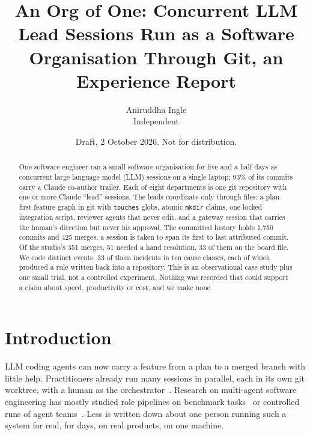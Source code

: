 \documentclass[11pt]{article}
\title{An Org of One: Concurrent LLM Lead Sessions Run as a Software Organisation
  Through Git, an Experience Report}
\author{Aniruddha Ingle\\Independent}
\date{Draft, 2 October 2026. Not for distribution.}
\newcommand{\code}[1]{\texttt{#1}}
\begin{document}
\maketitle

\begin{abstract}
One software engineer ran a small software organisation for five and a half days as %
concurrent large language model (LLM) sessions on a single laptop; 93\% of its commits %
carry a Claude co-author trailer. Each of eight departments is one git repository with one or more Claude %
``lead'' sessions. The leads coordinate only through files: a plan-first feature graph in
git with \code{touches} globs, atomic \code{mkdir} claims, one locked integration script,
reviewer agents that never edit, and a gateway session that carries the human's direction
but never his approval. The committed history holds 1,750 commits and 425 merges. %
a session is taken to span its first to last attributed commit. Of the studio's 351 %
merges, 51 needed a hand resolution, 33 of them on the board file. We code %
distinct events, 33 of them incidents in ten cause classes, each of which produced a rule %
written back into a repository. This is an observational case study plus one small
trial, not a controlled experiment. Nothing was recorded that could support a claim
about speed, productivity or cost, and we make none.
\end{abstract}

\section{Introduction}\label{sec:intro}

LLM coding agents can now carry a feature from a plan to a merged branch with little help.
Practitioners already run many sessions in parallel, each in its own git worktree, with a
human as the orchestrator~\citep{mason2026agents}. Research on multi-agent software
engineering has mostly studied role pipelines on benchmark
tasks~\citep{hong2023metagpt,qian2024chatdev,he2024llmmas} or controlled runs of agent
teams~\citep{destefanis2026coordinate}. Less is written down about one person running
such a system for real, for days, on real products, on one machine.
\end{document}
